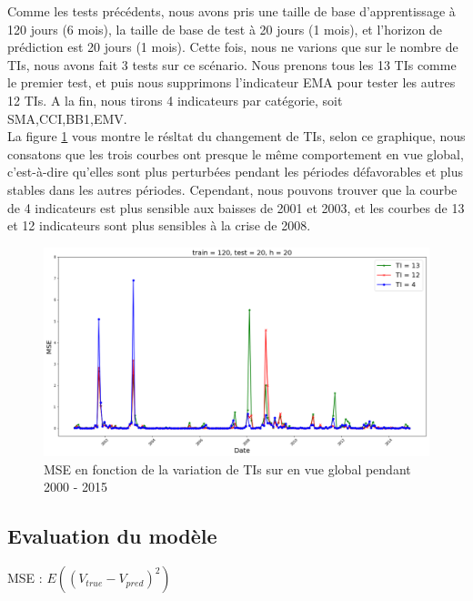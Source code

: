 Comme les tests précédents, nous avons pris une taille de base d'apprentissage à 120 jours (6 mois), la taille de base de test à 20 jours (1 mois), et l'horizon de prédiction est 20 jours (1 mois). Cette fois, nous ne varions que sur le nombre de TIs, nous avons fait 3 tests sur ce scénario. Nous prenons tous les 13 TIs comme le premier test, et puis nous supprimons l'indicateur EMA pour tester les autres 12 TIs. A la fin, nous tirons 4 indicateurs par catégorie, soit SMA,CCI,BB1,EMV. \\

La figure \ref{fig:TI} vous montre le résltat du changement de TIs, selon ce graphique, nous consatons que les trois courbes ont presque le même comportement en vue global, c'est-à-dire qu'elles sont plus perturbées pendant les périodes défavorables et plus stables dans les autres périodes. Cependant, nous pouvons trouver que la courbe de 4 indicateurs est plus sensible aux baisses de 2001 et 2003, et les courbes de 13 et 12 indicateurs sont plus sensibles à la crise de 2008. 


\begin{figure}[H]
	\centering
	\includegraphics[width=.9\linewidth, scale=0.2]
	{plot/MSE_120_20_20_N.png}
	\caption{MSE en fonction de la variation de TIs sur en vue global pendant 2000 - 2015}
	\label{fig:TI}
\end{figure}

\subsection{Evaluation du modèle}

MSE : $ E((V_{true} - V_{pred})^2) $

